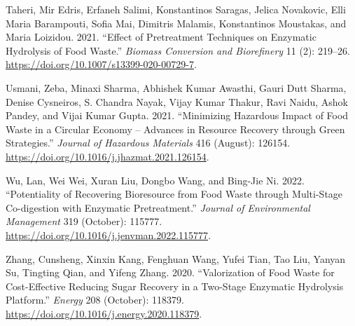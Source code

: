 \documentclass[11pt]{report}
\begin{document}
\begin{hangparas}{1.5em}{1}
\hypertarget{citeproc_bib_item_7}{Taheri, Mir Edris, Erfaneh Salimi, Konstantinos Saragas, Jelica Novakovic, Elli Maria Barampouti, Sofia Mai, Dimitris Malamis, Konstantinos Moustakas, and Maria Loizidou. 2021. “Effect of Pretreatment Techniques on Enzymatic Hydrolysis of Food Waste.” \textit{Biomass Conversion and Biorefinery} 11 (2): 219–26. \url{https://doi.org/10.1007/s13399-020-00729-7}.}

\hypertarget{citeproc_bib_item_8}{Usmani, Zeba, Minaxi Sharma, Abhishek Kumar Awasthi, Gauri Dutt Sharma, Denise Cysneiros, S. Chandra Nayak, Vijay Kumar Thakur, Ravi Naidu, Ashok Pandey, and Vijai Kumar Gupta. 2021. “Minimizing Hazardous Impact of Food Waste in a Circular Economy – Advances in Resource Recovery through Green Strategies.” \textit{Journal of Hazardous Materials} 416 (August): 126154. \url{https://doi.org/10.1016/j.jhazmat.2021.126154}.}

\hypertarget{citeproc_bib_item_9}{Wu, Lan, Wei Wei, Xuran Liu, Dongbo Wang, and Bing-Jie Ni. 2022. “Potentiality of Recovering Bioresource from Food Waste through Multi-Stage Co-digestion with Enzymatic Pretreatment.” \textit{Journal of Environmental Management} 319 (October): 115777. \url{https://doi.org/10.1016/j.jenvman.2022.115777}.}

\hypertarget{citeproc_bib_item_10}{Zhang, Cunsheng, Xinxin Kang, Fenghuan Wang, Yufei Tian, Tao Liu, Yanyan Su, Tingting Qian, and Yifeng Zhang. 2020. “Valorization of Food Waste for Cost-Effective Reducing Sugar Recovery in a Two-Stage Enzymatic Hydrolysis Platform.” \textit{Energy} 208 (October): 118379. \url{https://doi.org/10.1016/j.energy.2020.118379}.}\bigskip
\end{hangparas}
\end{document}
